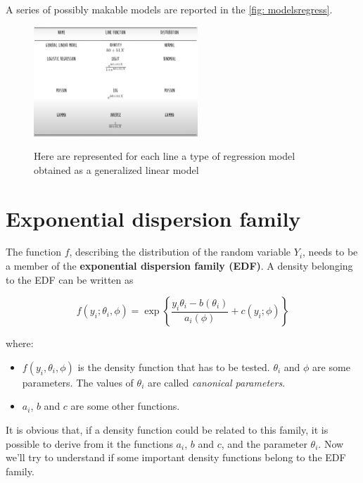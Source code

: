 
    A series of possibly makable models are reported in the \ref{fig:
    modelsregress}.
  
    \begin{figure}[h]
      \caption{Here are represented for each line a type of regression model obtained as a generalized linear model}
      \centering
      \includegraphics[width=0.55\textwidth]{ModelsWithDifferentCompositions}
      \label{fig: modelsregress}
      \end{figure}


  \section{Exponential dispersion family}
    The function $f$, describing the distribution of the random variable $Y_i$,
     needs to be a member of the \textbf{exponential dispersion family (EDF)}. A
     density belonging to the EDF can be written as

     \begin{equation} \label{eq: EDF}
      f(y_i;\theta_i,\phi)=\exp\left\{\frac{y_i\theta_i-b(\theta_i)}{a_i(\phi)}+c(y_i;\phi)\right\}
     \end{equation}

    where:
    \begin{itemize}
      \item $f(y_i, \theta_i, \phi)$ is the density function that has to be
      tested. $\theta_i$ and $\phi$ are some parameters. The values of
      $\theta_i$ are called \textit{canonical parameters}.
      \item $a_i$, $b$ and $c$ are some other functions.
    \end{itemize}
    
	It is obvious that, if a density function could be related to this family, it
	is possible to  derive from it the functions $a_i$, $b$ and $c$, and the
	parameter $\theta_i$. Now we'll try to understand if some important density
	functions belong to the EDF family.


